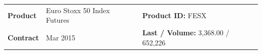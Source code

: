 \begingroup \scriptsize \setlength{\tabcolsep}{4pt} \renewcommand{\arraystretch}{1.08} \begin{englishtableblock} \noindent\begin{tabularx}{\textwidth}{@{} lXl@{}}\textbf{Product} & Euro Stoxx 50 Index Futures & \textbf{Product ID:} FESX \\
\textbf{Contract} & Mar 2015 & \textbf{Last / Volume:} 3,368.00 / 652,226 \\
\end{tabularx}
\end{englishtableblock}

\medskip

